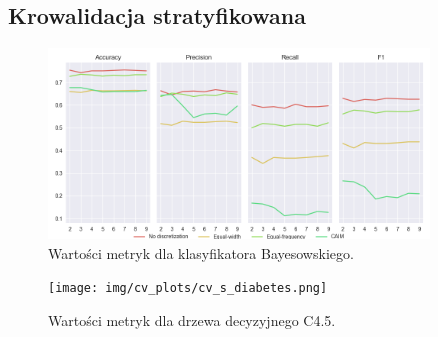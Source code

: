 \subsection*{Krowalidacja stratyfikowana}

\begin{figure}[H]
\center
    \includegraphics[width=0.9\textwidth]{img/cv_scores_stratifiedkfold/scoring_stratifiedkfold_diabetes.png}
    \caption{Wartości metryk dla klasyfikatora Bayesowskiego.}
\end{figure}

\begin{figure}[H]
    \center
    \texttt{[image: img/cv\_plots/cv\_s\_diabetes.png]}
    \caption{Wartości metryk dla drzewa decyzyjnego C4.5.}
\end{figure}


